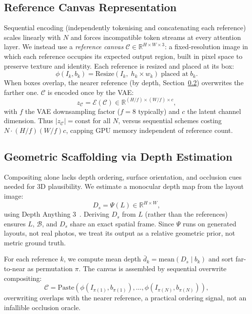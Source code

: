 \documentclass[runningheads]{llncs}
\begin{document}
\subsection{Reference Canvas Representation}
\label{sec:canvas}
Sequential encoding (independently tokenising and concatenating each reference) scales linearly with $N$ and forces incompatible token streams at every attention layer.
We instead use a \emph{reference canvas} $\mathcal{C} \in \mathbb{R}^{H \times W \times 3}$: a fixed-resolution image in which each reference occupies its expected output region, built in pixel space to preserve texture and identity.
Each reference is resized and placed at its box:
\begin{equation}
  \phi(I_k, b_k) = \mathrm{Resize}(I_k,\; h_k \times w_k)\;\text{placed at}\; b_k.
\end{equation}
When boxes overlap, the nearer reference (by depth, Section~\ref{sec:depth}) overwrites the farther one.
$\mathcal{C}$ is encoded once by the VAE:
\begin{equation}
  z_{\mathcal{C}} = \mathcal{E}(\mathcal{C}) \in \mathbb{R}^{(H/f) \times (W/f) \times c},
\end{equation}
with $f$ the VAE downsampling factor ($f=8$ typically) and $c$ the latent channel dimension.
Thus $|z_{\mathcal{C}}| = \text{const}$ for all $N$, versus sequential schemes costing $N \cdot (H/f)(W/f)c$, capping GPU memory independent of reference count.

\subsection{Geometric Scaffolding via Depth Estimation}
\label{sec:depth}
Compositing alone lacks depth ordering, surface orientation, and occlusion cues needed for 3D plausibility. We estimate a monocular depth map from the layout image:
\begin{equation}
  D_s = \Psi(L) \in \mathbb{R}^{H \times W},
\end{equation}
using Depth Anything 3~\cite{depthanything3}. Deriving $D_s$ from $L$ (rather than the references) ensures $L$, $\mathcal{B}$, and $D_s$ share an exact spatial frame. Since $\Psi$ runs on generated layouts, not real photos, we treat its output as a relative geometric prior, not metric ground truth.

For each reference $k$, we compute mean depth $\bar{d}_k = \mathrm{mean}(D_s \mid b_k)$ and sort far-to-near as permutation $\pi$. The canvas is assembled by sequential overwrite compositing:
\begin{equation}
  \mathcal{C} =
  \mathrm{Paste}\!\left(
    \phi(I_{\pi(1)}, b_{\pi(1)}), \ldots,
    \phi(I_{\pi(N)}, b_{\pi(N)})
  \right),
\end{equation}
overwriting overlaps with the nearer reference, a practical ordering signal, not an infallible occlusion oracle.
\end{document}
